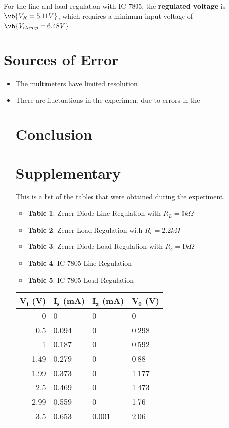 \documentclass{scrartcl}
\newcommand{\1}{\mathbbm{1}}
\begin{document}
For the line and load regulation with IC 7805, the \textbf{regulated voltage} is $\vb{V_R = 5.11V}$, which 
requires a minimum input voltage of $\vb{V_{clamp} = 6.48V}$.
\section{Sources of Error}
\begin{itemize}
	\item The multimeters have limited resolution.
	\item There are fluctuations in the experiment due to errors in the 
\section{Conclusion}
\newpage
\section{Supplementary}
This is a list of the tables that were obtained during the experiment.
\begin{itemize}
	\item \textbf{Table 1}: Zener Diode Line Regulation with $R_L = 0 k\Omega$
	\item \textbf{Table 2}: Zener Load Regulation with $R_c = 2.2 k\Omega$
	\item \textbf{Table 3}: Zener Diode Load Regulation with $R_c = 1 k\Omega$
	\item \textbf{Table 4}: IC 7805 Line Regulation
	\item \textbf{Table 5}: IC 7805 Load Regulation
\end{itemize}
\begin{table}[!ht]
    \centering
    \begin{tabular}{|r|l|l|l|}
    \hline
         \textbf{$\pmb{V_i}$ (V)} & \textbf{$\pmb{I_s}$ (mA)} & \textbf{$\pmb{I_z}$ (mA)} 
		& \textbf{$\pmb{V_0}$ (V)} \\ \hline
         0 & 0 & 0 & 0 \\ \hline
         0.5 & 0.094 & 0 & 0.298 \\ \hline
         1 & 0.187 & 0 & 0.592 \\ \hline
         1.49 & 0.279 & 0 & 0.88 \\ \hline
         1.99 & 0.373 & 0 & 1.177 \\ \hline
         2.5 & 0.469 & 0 & 1.473 \\ \hline
         2.99 & 0.559 & 0 & 1.76 \\ \hline
         3.5 & 0.653 & 0.001 & 2.06 \\ \hline

\end{tabular}
\end{table}
\end{itemize}
\end{document}
